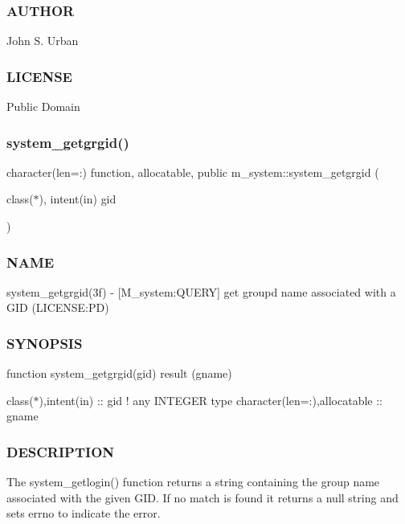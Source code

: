 \subsubsection*{A\+U\+T\+H\+OR}

John S. Urban \subsubsection*{L\+I\+C\+E\+N\+SE}

Public Domain \mbox{\label{namespacem__system_aec137429fbb8c848db4ecd914466d7e8}} 
\subsubsection{\texorpdfstring{system\+\_\+getgrgid()}{system\_getgrgid()}}
{\footnotesize\ttfamily character(len=\+:) function, allocatable, public m\+\_\+system\+::system\+\_\+getgrgid (\begin{DoxyParamCaption}\item[{class($\ast$), intent(in)}]{gid }\end{DoxyParamCaption})}



\subsubsection*{N\+A\+ME}

system\+\_\+getgrgid(3f) -\/ \mbox{[}M\+\_\+system\+:Q\+U\+E\+RY\mbox{]} get groupd name associated with a G\+ID (L\+I\+C\+E\+N\+SE\+:PD) \subsubsection*{S\+Y\+N\+O\+P\+S\+IS}

function system\+\_\+getgrgid(gid) result (gname)

class($\ast$),intent(in) \+:\+: gid ! any I\+N\+T\+E\+G\+ER type character(len=\+:),allocatable \+:\+: gname

\subsubsection*{D\+E\+S\+C\+R\+I\+P\+T\+I\+ON}

\begin{DoxyVerb}The system_getlogin() function returns a string containing the group
name associated with the given GID. If no match is found
it returns a null string and sets errno to indicate the error.
\end{DoxyVerb}


